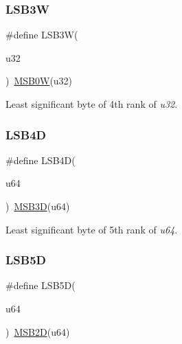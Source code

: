\subsubsection{\texorpdfstring{LSB3W}{LSB3W}}
{\footnotesize\ttfamily \#define L\+S\+B3W(\begin{DoxyParamCaption}\item[{}]{u32 }\end{DoxyParamCaption})~\mbox{\hyperlink{group__group__sam0__utils_ga25110f05bdb5b5ea3fcb2854a1a07d7a}{M\+S\+B0W}}(u32)}



Least significant byte of 4th rank of {\itshape u32}. 

\mbox{\label{group__group__sam0__utils_gaab745f30b9b841f9ccd9ace0a5a1a9e5}} 
\subsubsection{\texorpdfstring{LSB4D}{LSB4D}}
{\footnotesize\ttfamily \#define L\+S\+B4D(\begin{DoxyParamCaption}\item[{}]{u64 }\end{DoxyParamCaption})~\mbox{\hyperlink{group__group__sam0__utils_gaf7972d3282ec9ecb97afa34e848ede2c}{M\+S\+B3D}}(u64)}



Least significant byte of 5th rank of {\itshape u64}. 

\mbox{\label{group__group__sam0__utils_gac379acb246797736332fa1b8ae481b34}} 
\subsubsection{\texorpdfstring{LSB5D}{LSB5D}}
{\footnotesize\ttfamily \#define L\+S\+B5D(\begin{DoxyParamCaption}\item[{}]{u64 }\end{DoxyParamCaption})~\mbox{\hyperlink{group__group__sam0__utils_gad4ceacba543e7b8617ca4bd075abb146}{M\+S\+B2D}}(u64)}



